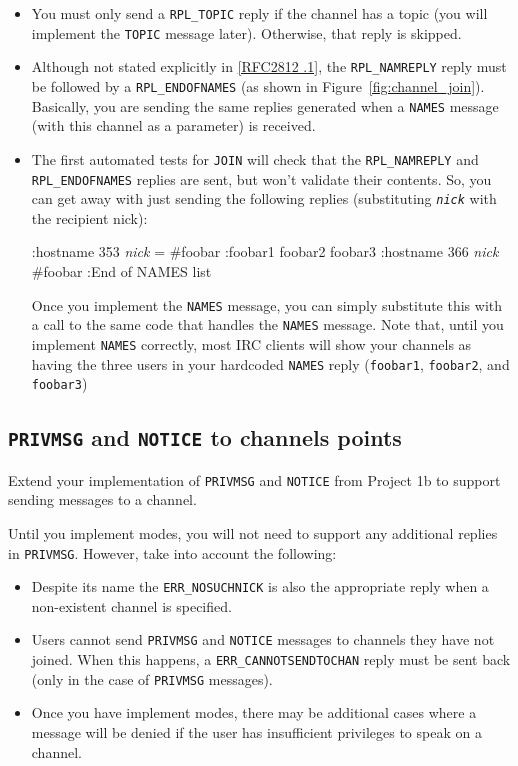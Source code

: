 \documentclass[10pt]{article}
\newcommand{\RFCsection}[2]{\href{http://tools.ietf.org/html/rfc#1\#section-#2}{[RFC#1 \textsection #2]}}
\newcommand{\points}[1]{{\sffamily\mdseries\guillemotleft #1 points\guillemotright{}}}
\newenvironment{example}%
{\VerbatimEnvironment\begin{Sbox}\begin{VerbExample}}%
{\end{VerbExample}\end{Sbox}\setlength{\fboxsep}{8pt}\begin{center}\fcolorbox{black}{backgroundgray}{\TheSbox}\end{center}}
\begin{document}
\begin{itemize}
\item You must only send a \texttt{RPL\_TOPIC} reply if the channel has a topic (you will implement the \texttt{TOPIC} message later). Otherwise, that reply is skipped.
\item Although not stated explicitly in \RFCsection{2812}{3.2.1}, the \texttt{RPL\_NAMREPLY} reply must be followed by a \texttt{RPL\_ENDOFNAMES} (as shown in Figure~\ref{fig:channel_join}). Basically, you are sending the same replies generated when a \texttt{NAMES} message (with this channel as a parameter) is received.
\item The first automated tests for \texttt{JOIN} will check that the \texttt{RPL\_NAMREPLY} and \texttt{RPL\_ENDOFNAMES} replies are sent, but won't validate their contents. So, you can get away with just sending the following replies (substituting \emph{\texttt{nick}} with the recipient nick):

\begin{example}
:hostname 353 \emph{nick} = #foobar :foobar1 foobar2 foobar3
:hostname 366 \emph{nick} #foobar :End of NAMES list
\end{example}

Once you implement the \texttt{NAMES} message, you can simply substitute this with a call to the same code that handles the \texttt{NAMES} message. Note that, until you implement \texttt{NAMES} correctly, most IRC clients will show your channels as having the three users in your hardcoded \texttt{NAMES} reply (\texttt{foobar1}, \texttt{foobar2}, and \texttt{foobar3})
\end{itemize}


\subsection{\texttt{PRIVMSG} and \texttt{NOTICE} to channels \points{15}}

Extend your implementation of \texttt{PRIVMSG} and \texttt{NOTICE} from Project 1b to support sending messages to a channel.

Until you implement modes, you will not need to support any additional replies in \texttt{PRIVMSG}. However, take into account the following:

\begin{itemize}
\item Despite its name the \texttt{ERR\_NOSUCHNICK} is also the appropriate reply when a non-existent channel is specified.
\item Users cannot send \texttt{PRIVMSG} and \texttt{NOTICE} messages to channels they have not joined. When this happens, a \texttt{ERR\_CANNOTSENDTOCHAN} reply must be sent back (only in the case of \texttt{PRIVMSG} messages).
\item Once you have implement modes, there may be additional cases where a message will be denied if the user has insufficient privileges to speak on a channel.
\end{itemize}
\end{document}
